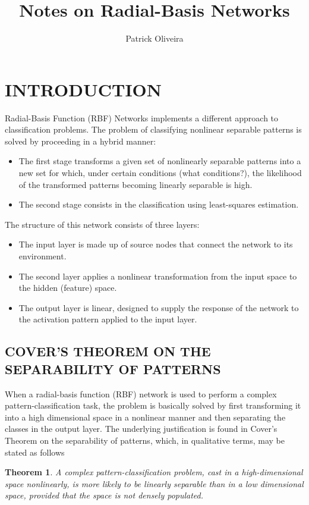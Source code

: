 \documentclass{article}
\title{Notes on Radial-Basis Networks}
\author{Patrick Oliveira}
\affil{}
\newtheorem{theorem}{Theorem}[section]
\begin{document}
\maketitle

\section{INTRODUCTION}
Radial-Basis Function (RBF) Networks implements a different approach to classification problems. The problem of classifying nonlinear separable patterns is solved by proceeding in a hybrid manner:

\begin{itemize}
	\item The first stage transforms a given set of nonlinearly separable patterns into a new set for which, under certain conditions (what conditions?), the likelihood of the transformed patterns becoming linearly separable is high.
	\item The second stage consists in the classification using least-squares estimation.
\end{itemize}

The structure of this network consists of three layers:

\begin{itemize}
	\item The input layer is made up of source nodes that connect the network to its environment.
	\item The second layer applies a nonlinear transformation from the input space to the hidden (feature) space.
	\item The output layer is linear, designed to supply the response of the network to the activation pattern applied to the input layer.
\end{itemize}

\subsection{COVER'S THEOREM ON THE SEPARABILITY OF PATTERNS}
When a radial-basis function (RBF) network is used to perform a complex pattern-classification task, the problem is basically solved by first transforming it into a high dimensional space in a nonlinear manner and then separating the classes in the output layer. The underlying justification is found in Cover's Theorem on the separability of patterns, which, in qualitative terms, may be stated as follows

\begin{theorem}
	A complex pattern-classification problem, cast in a high-dimensional space nonlinearly, is more likely to be linearly separable than in a low dimensional space, provided that the space is not densely populated.
\end{theorem}
\end{document}
